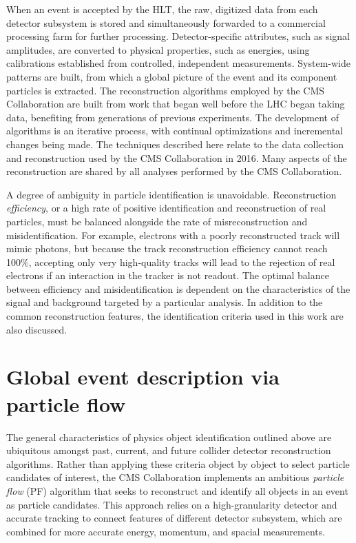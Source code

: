When an event is accepted by the HLT, the raw, digitized data from each detector
subsystem is stored and simultaneously forwarded to a commercial processing farm for
further processing. Detector-specific attributes, such as signal amplitudes,
are converted to physical properties, such as energies, using calibrations
established from controlled, independent measurements. System-wide patterns
are built, from which a global picture of the event and its component particles
is extracted.
The reconstruction algorithms employed by the CMS Collaboration are built from
work that began well before the LHC began taking data, 
benefiting from generations of previous experiments. The development of algorithms
is an iterative process, with continual optimizations and incremental changes
being made. The techniques described here relate to the data collection and reconstruction
used by the CMS Collaboration in 2016. Many aspects of the reconstruction
are shared by all analyses performed by the CMS Collaboration. 

A degree of ambiguity in particle identification is unavoidable. 
Reconstruction \emph{efficiency}, or a high rate of positive identification
and reconstruction of real particles, must be balanced alongside the rate of misreconstruction
and misidentification.
For example, electrons with a poorly reconstructed track will mimic photons,
but because the track reconstruction efficiency cannot reach 100\%,
accepting only very high-quality tracks will lead to the rejection
of real electrons if an interaction in the tracker is not readout.
The optimal balance between efficiency and misidentification is dependent
on the characteristics of the signal and background targeted by a particular
analysis. In addition to the common reconstruction features, the identification 
criteria used in this work are also discussed.

\section{Global event description via particle flow}
The general characteristics of physics object identification outlined
above are ubiquitous amongst past, current, and future collider detector
reconstruction algorithms. Rather than applying these criteria object by
object to select particle candidates of interest, 
the CMS Collaboration implements an ambitious \emph{particle flow} (PF)
algorithm that seeks to reconstruct and identify all objects in an
event as particle candidates. This approach relies on a high-granularity
detector and accurate tracking to connect features of different detector
subsystem, which are combined for more accurate energy, momentum, and
spacial measurements. 

